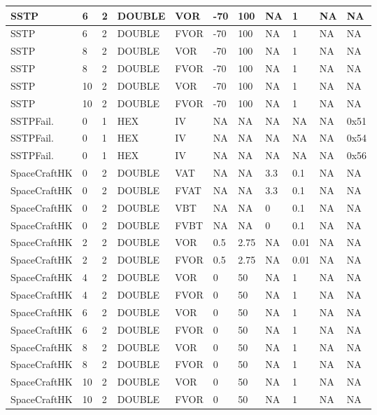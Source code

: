 {\begin{longtable}{|l|l|l|l|l|l|l|l|l|l|l|}
SSTP & 6 & 2 & DOUBLE & VOR & -70 & 100 & NA & 1 & NA & NA \\ \hline
SSTP & 6 & 2 & DOUBLE & FVOR & -70 & 100 & NA & 1 & NA & NA \\ \hline
SSTP & 8 & 2 & DOUBLE & VOR & -70 & 100 & NA & 1 & NA & NA \\ \hline
SSTP & 8 & 2 & DOUBLE & FVOR & -70 & 100 & NA & 1 & NA & NA \\ \hline
SSTP & 10 & 2 & DOUBLE & VOR & -70 & 100 & NA & 1 & NA & NA \\ \hline
SSTP & 10 & 2 & DOUBLE & FVOR & -70 & 100 & NA & 1 & NA & NA \\ \hline
SSTPFail. & 0 & 1 & HEX & IV & NA & NA & NA & NA & NA & 0x51 \\ \hline
SSTPFail. & 0 & 1 & HEX & IV & NA & NA & NA & NA & NA & 0x54 \\ \hline
SSTPFail. & 0 & 1 & HEX & IV & NA & NA & NA & NA & NA & 0x56 \\ \hline
SpaceCraftHK & 0 & 2 & DOUBLE & VAT & NA & NA & 3.3 & 0.1 & NA & NA \\ \hline
SpaceCraftHK & 0 & 2 & DOUBLE & FVAT & NA & NA & 3.3 & 0.1 & NA & NA \\ \hline
SpaceCraftHK & 0 & 2 & DOUBLE & VBT & NA & NA & 0 & 0.1 & NA & NA \\ \hline
SpaceCraftHK & 0 & 2 & DOUBLE & FVBT & NA & NA & 0 & 0.1 & NA & NA \\ \hline
SpaceCraftHK & 2 & 2 & DOUBLE & VOR & 0.5 & 2.75 & NA & 0.01 & NA & NA \\ \hline
SpaceCraftHK & 2 & 2 & DOUBLE & FVOR & 0.5 & 2.75 & NA & 0.01 & NA & NA \\ \hline
SpaceCraftHK & 4 & 2 & DOUBLE & VOR & 0 & 50 & NA & 1 & NA & NA \\ \hline
SpaceCraftHK & 4 & 2 & DOUBLE & FVOR & 0 & 50 & NA & 1 & NA & NA \\ \hline
SpaceCraftHK & 6 & 2 & DOUBLE & VOR & 0 & 50 & NA & 1 & NA & NA \\ \hline
SpaceCraftHK & 6 & 2 & DOUBLE & FVOR & 0 & 50 & NA & 1 & NA & NA \\ \hline
SpaceCraftHK & 8 & 2 & DOUBLE & VOR & 0 & 50 & NA & 1 & NA & NA \\ \hline
SpaceCraftHK & 8 & 2 & DOUBLE & FVOR & 0 & 50 & NA & 1 & NA & NA \\ \hline
SpaceCraftHK & 10 & 2 & DOUBLE & VOR & 0 & 50 & NA & 1 & NA & NA \\ \hline
SpaceCraftHK & 10 & 2 & DOUBLE & FVOR & 0 & 50 & NA & 1 & NA & NA \\ \hline

\end{longtable}}
